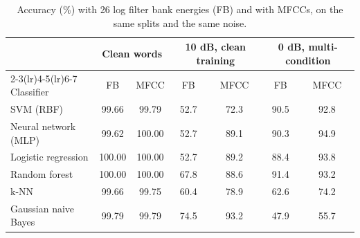 \begin{table}[H]\centering\small
\caption{Accuracy (\%) with 26 log filter bank energies (FB) and with MFCCs, on the same splits and the same noise.}\label{tab:fbank}
\setlength{\tabcolsep}{4pt}\begin{tabular}{lcccccc}\toprule
& \multicolumn{2}{c}{Clean words} & \multicolumn{2}{c}{10 dB, clean training} & \multicolumn{2}{c}{0 dB, multi-condition}\\\cmidrule(lr){2-3}\cmidrule(lr){4-5}\cmidrule(lr){6-7}
Classifier & FB & MFCC & FB & MFCC & FB & MFCC\\\midrule
SVM (RBF) & 99.66 & 99.79 & 52.7 & 72.3 & 90.5 & 92.8\\
Neural network (MLP) & 99.62 & 100.00 & 52.7 & 89.1 & 90.3 & 94.9\\
Logistic regression & 100.00 & 100.00 & 52.7 & 89.2 & 88.4 & 93.8\\
Random forest & 100.00 & 100.00 & 67.8 & 88.6 & 91.4 & 93.2\\
k-NN & 99.66 & 99.75 & 60.4 & 78.9 & 62.6 & 74.2\\
Gaussian naive Bayes & 99.79 & 99.79 & 74.5 & 93.2 & 47.9 & 55.7\\
\bottomrule\end{tabular}\end{table}
